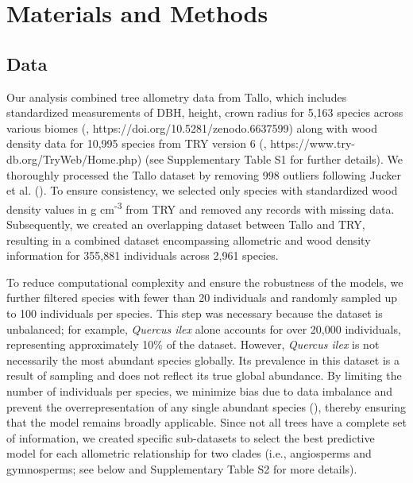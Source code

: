 \documentclass[
  12pt,
  letterpaper,
  DIV=11,
  numbers=noendperiod]{scrartcl}
\begin{document}
\section{Materials and Methods}\label{materials-and-methods}

\subsection{Data}\label{data}

Our analysis combined tree allometry data from Tallo, which includes
standardized measurements of DBH, height, crown radius for 5,163 species
across various biomes (,
https://doi.org/10.5281/zenodo.6637599) along with wood density data for
10,995 species from TRY version 6 (, https://www.try-db.org/TryWeb/Home.php) (see Supplementary
Table S1 for further details). We thoroughly processed the Tallo dataset
by removing 998 outliers following Jucker et al.
(). To ensure consistency, we selected
only species with standardized wood density values in g
cm\textsuperscript{-3} from TRY and removed any records with missing
data. Subsequently, we created an overlapping dataset between Tallo and
TRY, resulting in a combined dataset encompassing allometric and wood
density information for 355,881 individuals across 2,961 species.

To reduce computational complexity and ensure the robustness of the
models, we further filtered species with fewer than 20 individuals and
randomly sampled up to 100 individuals per species. This step was
necessary because the dataset is unbalanced; for example, \emph{Quercus
ilex} alone accounts for over 20,000 individuals, representing
approximately 10\% of the dataset. However, \emph{Quercus ilex} is not
necessarily the most abundant species globally. Its prevalence in this
dataset is a result of sampling and does not reflect its true global
abundance. By limiting the number of individuals per species, we
minimize bias due to data imbalance and prevent the overrepresentation
of any single abundant species (), thereby ensuring that the model remains broadly applicable.
Since not all trees have a complete set of information, we created
specific sub-datasets to select the best predictive model for each
allometric relationship for two clades (i.e., angiosperms and
gymnosperms; see below and Supplementary Table S2 for more details).
\end{document}

